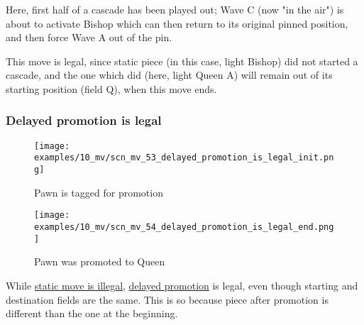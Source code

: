 \vspace*{-0.4\baselineskip}
Here, first half of a cascade has been played out; Wave C (now "in the air") is
about to activate Bishop which can then return to its original pinned position,
and then force Wave A out of the pin.

This move is legal, since static piece (in this case, light Bishop) did not started
a cascade, and the one which did (here, light Queen A) will remain out of its
starting position (field Q), when this move ends.

\clearpage %

\subsubsection*{Delayed promotion is legal}
\label{sec:Miranda's veil/Wave/Cascading Waves/Delayed promotion is legal}

\noindent
\begin{figure}[!h]
\texttt{[image: examples/10\_mv/scn\_mv\_53\_delayed\_promotion\_is\_legal\_init.png]}
\caption{Pawn is tagged for promotion}
\label{fig:scn_mv_53_delayed_promotion_is_legal_init}
\end{figure}

\noindent
\begin{figure}[!h]
\texttt{[image: examples/10\_mv/scn\_mv\_54\_delayed\_promotion\_is\_legal\_end.png]}
\caption{Pawn was promoted to Queen}
\label{fig:scn_mv_54_delayed_promotion_is_legal_end}
\end{figure}

While \hyperref[fig:scn_mv_49_static_move_is_illegal_init]{static move is illegal},
\hyperref[sec:Age of Aquarius/Promotion]{delayed promotion} is legal, even though
starting and destination fields are the same. This is so because piece after
promotion is different than the one at the beginning.

\clearpage %

